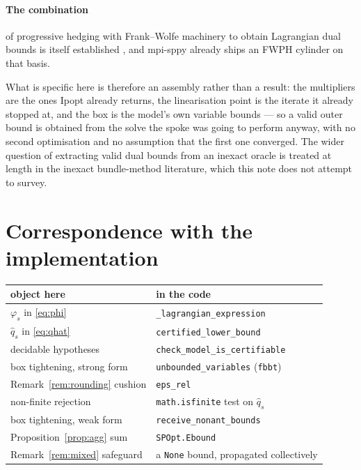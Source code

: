 \documentclass[11pt]{article}
\theoremstyle{plain}
\theoremstyle{remark}
\newcommand{\qhat}{\hat{q}}
\begin{document}
\paragraph{The combination} of progressive hedging with Frank--Wolfe machinery to
obtain Lagrangian dual bounds is itself established \cite{boland2018}, and
mpi-sppy already ships an FWPH cylinder on that basis.

What is specific here is therefore an assembly rather than a result: the
multipliers are the ones Ipopt already returns, the linearisation point is the
iterate it already stopped at, and the box is the model's own variable bounds ---
so a valid outer bound is obtained from the solve the spoke was going to perform
anyway, with no second optimisation and no assumption that the first one
converged.  The wider question of extracting valid dual bounds from an inexact
oracle is treated at length in the inexact bundle-method literature, which this
note does not attempt to survey.

\section{Correspondence with the implementation}

\begin{center}
\begin{tabular}{ll}
\toprule
object here & in the code \\
\midrule
$\varphi_s$ in \eqref{eq:phi}      & \texttt{\_lagrangian\_expression} \\
$\qhat_s$ in \eqref{eq:qhat}       & \texttt{certified\_lower\_bound} \\
decidable hypotheses               & \texttt{check\_model\_is\_certifiable} \\
box tightening, strong form        & \texttt{unbounded\_variables} (\texttt{fbbt}) \\
Remark~\ref{rem:rounding} cushion  & \texttt{eps\_rel} \\
non-finite rejection               & \texttt{math.isfinite} test on $\qhat_s$ \\
\midrule
box tightening, weak form          & \texttt{receive\_nonant\_bounds} \\
Proposition~\ref{prop:agg} sum     & \texttt{SPOpt.Ebound} \\
Remark~\ref{rem:mixed} safeguard   & a \texttt{None} bound, propagated collectively \\
\bottomrule
\end{tabular}
\end{center}
\end{document}
